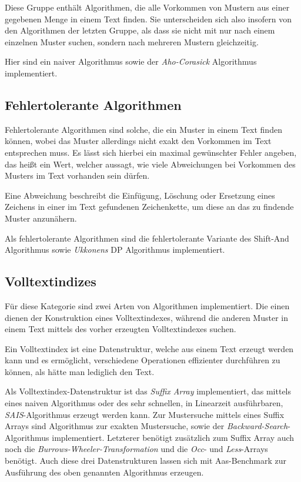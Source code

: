 \documentclass[twocolumn]{article}
\begin{document}
Diese Gruppe enthält Algorithmen, die alle Vorkommen von Mustern aus einer gegebenen Menge in einem Text finden. Sie unterscheiden sich also insofern von den Algorithmen der letzten Gruppe, als dass sie nicht mit nur nach einem einzelnen Muster suchen, sondern nach mehreren Mustern gleichzeitig.

Hier sind ein naiver Algorithmus sowie der \textit{Aho-Corasick} Algorithmus implementiert.

\subsection{Fehlertolerante Algorithmen}

Fehlertolerante Algorithmen sind solche, die ein Muster in einem Text finden können, wobei das Muster allerdings nicht exakt den Vorkommen im Text entsprechen muss. Es lässt sich hierbei ein maximal gewünschter Fehler angeben, das heißt ein Wert, welcher aussagt, wie viele Abweichungen bei Vorkommen des Musters im Text vorhanden sein dürfen.

Eine Abweichung beschreibt die Einfügung, Löschung oder Ersetzung eines Zeichens in einer im Text gefundenen Zeichenkette, um diese an das zu findende Muster anzunähern.

Als fehlertolerante Algorithmen sind die fehlertolerante Variante des Shift-And Algorithmus sowie \textit{Ukkonens} DP Algorithmus implementiert.

\subsection{Volltextindizes}

Für diese Kategorie sind zwei Arten von Algorithmen implementiert. Die einen dienen der Konstruktion eines Volltextindexes, während die anderen Muster in einem Text mittels des vorher erzeugten Volltextindexes suchen.

Ein Volltextindex ist eine Datenstruktur, welche aus einem Text erzeugt werden kann und es ermöglicht, verschiedene Operationen effizienter durchführen zu können, als hätte man lediglich den Text.

Als Volltextindex-Datenstruktur ist das \textit{Suffix Array} implementiert, das mittels eines naiven Algorithmus oder des sehr schnellen, in Linearzeit ausführbaren, \textit{SAIS}-Algorithmus erzeugt werden kann. Zur Mustersuche mittels eines Suffix Arrays sind Algorithmus zur exakten Mustersuche, sowie der \textit{Backward-Search}-Algorithmus implementiert. Letzterer benötigt zusätzlich zum Suffix Array auch noch die \textit{Burrows-Wheeler-Transformation} und die \textit{Occ}- und \textit{Less}-Arrays benötigt. Auch diese drei Datenstrukturen lassen sich mit Aas-Benchmark zur Ausführung des oben genannten Algorithmus erzeugen.
\end{document}
